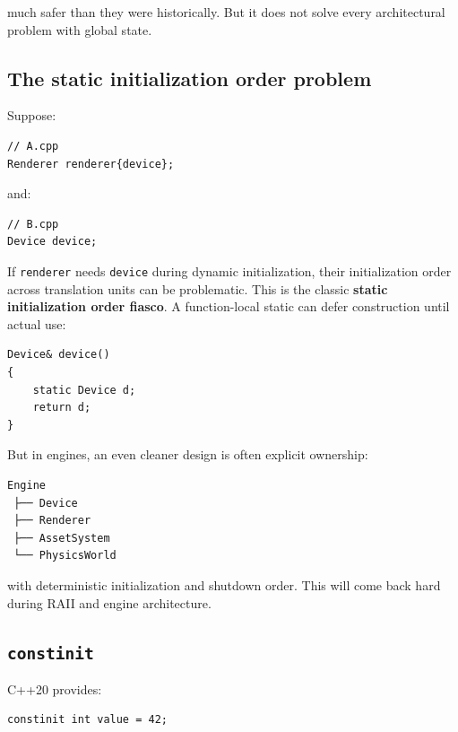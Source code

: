 much safer than they were historically. But it does not solve every architectural problem with global state.

\subsection{The static initialization order problem}\label{05-engine-i-ch002-the-static-initialization-order-problem}

\hypertarget{05-engine-i-ch002-the-static-initialization-order-problem}{}

Suppose:

\begin{verbatim}
// A.cpp
Renderer renderer{device};
\end{verbatim}

and:

\begin{verbatim}
// B.cpp
Device device;
\end{verbatim}

If \texttt{renderer} needs \texttt{device} during dynamic initialization, their initialization order across translation units can be problematic. This is the classic \textbf{static initialization order fiasco}. A function-local static can defer construction until actual use:

\begin{verbatim}
Device& device()
{
    static Device d;
    return d;
}
\end{verbatim}

But in engines, an even cleaner design is often explicit ownership:

\begin{verbatim}
Engine
 ├── Device
 ├── Renderer
 ├── AssetSystem
 └── PhysicsWorld
\end{verbatim}

with deterministic initialization and shutdown order. This will come back hard during RAII and engine architecture.

\subsection{\texorpdfstring{\texttt{constinit}}{constinit}}\label{05-engine-i-ch002-constinit}

\hypertarget{05-engine-i-ch002-constinit}{}

C++20 provides:

\begin{verbatim}
constinit int value = 42;
\end{verbatim}

